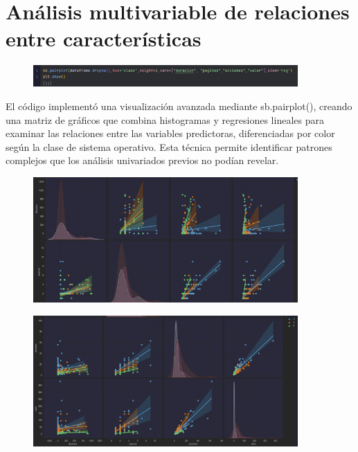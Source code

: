 \documentclass{article}
\begin{document}
\newpage

\section*{Análisis multivariable de relaciones entre características}

\begin{figure}[H]
\centering
\includegraphics[width=0.9\textwidth]{Actividad-11/Imagen4.png}
\end{figure}

El código implementó una visualización avanzada mediante sb.pairplot(), creando una matriz de gráficos que combina histogramas y regresiones lineales para examinar las relaciones entre las variables predictoras, diferenciadas por color según la clase de sistema operativo. Esta técnica permite identificar patrones complejos que los análisis univariados previos no podían revelar.

\begin{figure}[H]
\centering
\includegraphics[width=0.9\textwidth]{Actividad-11/Imagen5.png}
\end{figure}

\begin{figure}[H]
\centering
\includegraphics[width=0.9\textwidth]{Actividad-11/Imagen6.png}
\end{figure}
\end{document}
